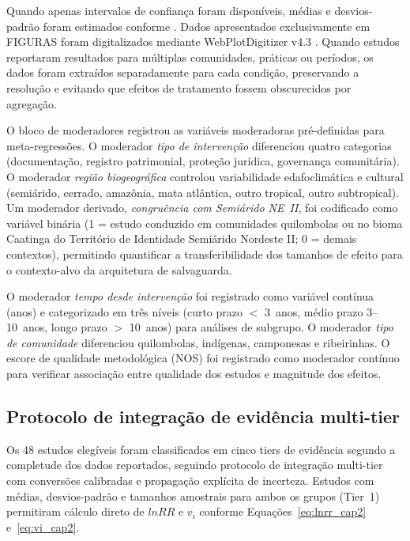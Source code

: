 \noindent Quando apenas intervalos de confiança foram disponíveis, médias e desvios-padrão foram estimados conforme . Dados apresentados exclusivamente em FIGURAS foram digitalizados mediante WebPlotDigitizer v4.3 \cite{Rohatgi2020}. Quando estudos reportaram resultados para múltiplas comunidades, práticas ou períodos, os dados foram extraídos separadamente para cada condição, preservando a resolução e evitando que efeitos de tratamento fossem obscurecidos por agregação.

O bloco de moderadores registrou as variáveis moderadoras pré-definidas para meta-regressões. O moderador \textit{tipo de intervenção} diferenciou quatro categorias (documentação, registro patrimonial, proteção jurídica, governança comunitária). O moderador \textit{região biogeográfica} controlou variabilidade edafoclimática e cultural (semiárido, cerrado, amazônia, mata atlântica, outro tropical, outro subtropical). Um moderador derivado, \textit{congruência com Semiárido NE~II}, foi codificado como variável binária (1 = estudo conduzido em comunidades quilombolas ou no bioma Caatinga do Território de Identidade Semiárido Nordeste II; 0 = demais contextos), permitindo quantificar a transferibilidade dos tamanhos de efeito para o contexto-alvo da arquitetura de salvaguarda.

O moderador \textit{tempo desde intervenção} foi registrado como variável contínua (anos) e categorizado em três níveis (curto prazo $<$ 3~anos, médio prazo 3--10~anos, longo prazo $>$ 10~anos) para análises de subgrupo. O moderador \textit{tipo de comunidade} diferenciou quilombolas, indígenas, camponesas e ribeirinhas. O escore de qualidade metodológica (NOS) foi registrado como moderador contínuo para verificar associação entre qualidade dos estudos e magnitude dos efeitos.

\subsection{Protocolo de integração de evidência multi-tier}
\label{sec:multitier_cap2}

Os 48 estudos elegíveis foram classificados em cinco tiers de evidência segundo a completude dos dados reportados, seguindo protocolo de integração multi-tier com conversões calibradas e propagação explícita de incerteza. Estudos com médias, desvios-padrão e tamanhos amostrais para ambos os grupos (Tier~1) permitiram cálculo direto de $lnRR$ e $v_i$ conforme Equações~\ref{eq:lnrr_cap2} e~\ref{eq:vi_cap2}.

